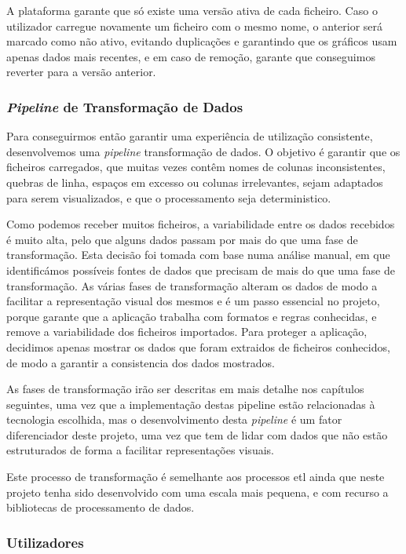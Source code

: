 A plataforma garante que só existe uma versão ativa de cada ficheiro. Caso o utilizador carregue novamente um ficheiro com o mesmo nome, o anterior será marcado como não ativo, evitando duplicações e garantindo que os gráficos usam apenas dados mais recentes, e em caso de remoção, garante que conseguimos reverter para a versão anterior.

\subsubsection{\textit{Pipeline} de Transformação de Dados}

Para conseguirmos então garantir uma experiência de utilização consistente, desenvolvemos uma \textit{pipeline} transformação de dados. O objetivo é garantir que os ficheiros carregados, que muitas vezes contêm nomes de colunas inconsistentes, quebras de linha, espaços em excesso ou colunas irrelevantes, sejam adaptados para serem visualizados, e que o processamento seja deterministico.

Como podemos receber muitos ficheiros, a variabilidade entre os dados recebidos é muito alta, pelo que alguns dados passam por mais do que uma fase de transformação. Esta decisão foi tomada com base numa análise manual, em que identificámos possíveis fontes de dados que precisam de mais do que uma fase de transformação. As várias fases de transformação alteram os dados de modo a facilitar a representação visual dos mesmos e é um passo essencial no projeto, porque garante que a aplicação trabalha com formatos e regras conhecidas, e remove a variabilidade dos ficheiros importados. Para proteger a aplicação, decidimos apenas mostrar os dados que foram extraidos de ficheiros conhecidos, de modo a garantir a consistencia dos dados mostrados.

As fases de transformação irão ser descritas em mais detalhe nos capítulos seguintes, uma vez que a implementação destas pipeline estão relacionadas à tecnologia escolhida, mas o desenvolvimento desta \textit{pipeline} é um fator diferenciador deste projeto, uma vez que tem de lidar com dados que não estão estruturados de forma a facilitar representações visuais. 

Este processo de transformação é semelhante aos processos \gls{etl} ainda que neste projeto tenha sido desenvolvido com uma escala mais pequena, e com recurso a bibliotecas de processamento de dados.

\subsubsection{Utilizadores}

